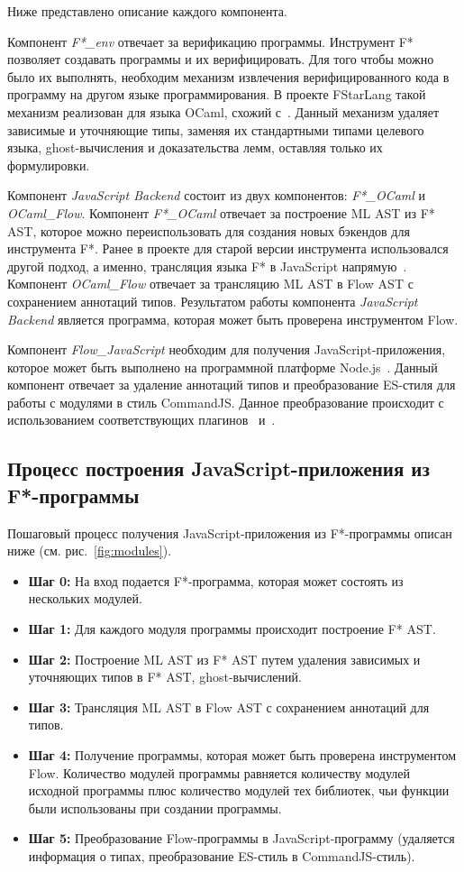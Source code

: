 Ниже представлено описание каждого компонента.

Компонент \textit{F*\_env} отвечает за верификацию программы. Инструмент F* позволяет создавать программы и их верифицировать. Для того чтобы можно было их выполнять, необходим механизм извлечения верифицированного кода в программу на другом языке программирования. В проекте FStarLang такой механизм реализован для языка OCaml, схожий с~\cite{Letouzey2008}. Данный механизм удаляет зависимые и уточняющие типы, заменяя их стандартными типами целевого языка, ghost-вычисления и доказательства лемм, оставляя только их формулировки.

Компонент \textit{JavaScript Backend} состоит из двух компонентов: \textit{F*\_OCaml} и \textit{OCaml\_Flow}. Компонент \textit{F*\_OCaml} отвечает за построение ML AST из F* AST, которое можно переиспользовать для создания новых бэкендов для инструмента F*. Ранее в проекте для старой версии инструмента использовался другой подход, а именно, трансляция языка F* в JavaScript напрямую~\cite{fully_abstract_js}. Компонент \textit{OCaml\_Flow} отвечает за трансляцию ML AST в Flow AST с сохранением аннотаций типов. Результатом работы компонента \textit{JavaScript Backend} является программа, которая может быть проверена инструментом Flow.

Компонент \textit{Flow\_JavaScript} необходим для получения JavaScript-приложения, которое может быть выполнено на программной платформе Node.js~\cite{node_js}. Данный компонент отвечает за удаление аннотаций типов и преобразование ES-стиля для работы с модулями в стиль CommandJS. Данное преобразование происходит с использованием соответствующих плагинов~\cite{flow_plugin} и~\cite{module_plugin}.

\subsection{Процесс построения JavaScript-приложения из F*-программы}

Пошаговый процесс получения JavaScript-приложения из F*-программы описан ниже (см. рис.~\ref{fig:modules}).

\begin{itemize}
\item \textbf{Шаг 0:} На вход подается F*-программа, которая может состоять из нескольких модулей. 
\item \textbf{Шаг 1:} Для каждого модуля программы происходит построение F* AST.
\item \textbf{Шаг 2:} Построение ML AST из F* AST путем удаления зависимых и уточняющих типов в F* AST, ghost-вычислений.
\item \textbf{Шаг 3:} Трансляция ML AST в Flow AST с сохранением аннотаций для типов.
\item \textbf{Шаг 4:} Получение программы, которая может быть проверена инструментом Flow. Количество модулей программы равняется количеству модулей исходной программы плюс количество модулей тех библиотек, чьи функции были использованы при создании программы. 
\item \textbf{Шаг 5:} Преобразование Flow-программы в JavaScript-программу (удаляется информация о типах, преобразование ES-стиль в CommandJS-стиль).
\end{itemize}

